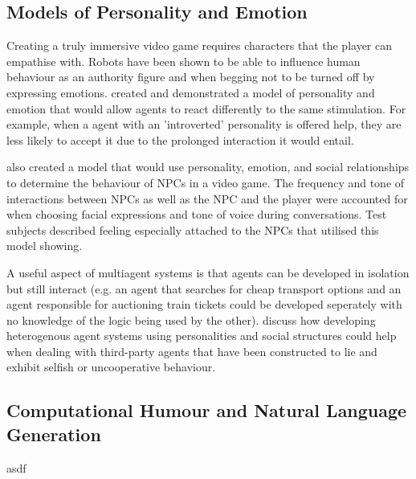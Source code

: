 \documentclass[conference]{IEEEtran}
\begin{document}
\subsection{Models of Personality and Emotion}

Creating a truly immersive video game requires characters that the player can empathise with. Robots have been shown to be able to influence human behaviour as an authority figure \cite{bossrobot} and when begging not to be turned off \cite{turnoffrobot} by expressing emotions. \cite{personalitymodel} created and demonstrated a model of personality and emotion that would allow agents to react differently to the same stimulation. For example, when a agent with an 'introverted' personality is offered help, they are less likely to accept it due to the prolonged interaction it would entail. 

	\cite{skyrim} also created a model that would use personality, emotion, and social relationships to determine the behaviour of NPCs in a video game. The frequency and tone of interactions between NPCs as well as the NPC and the player were accounted for when choosing facial expressions and tone of voice during conversations. Test subjects described feeling especially attached to the NPCs that utilised this model showing.

A useful aspect of multiagent systems is that agents can be developed in isolation but still interact (e.g. an agent that searches for cheap transport options and an agent responsible for auctioning train tickets could be developed seperately with no knowledge of the logic being used by the other). \cite{hetrogenousagents} discuss how developing heterogenous agent systems using personalities and social structures could help when dealing with third-party agents that have been constructed to lie and exhibit selfish or uncooperative behaviour.

\subsection{Computational Humour and Natural Language Generation}



\begin{thebibliography}{00}
		\bibitem asdf
\end{thebibliography}
\vspace{12pt}
\end{document}
